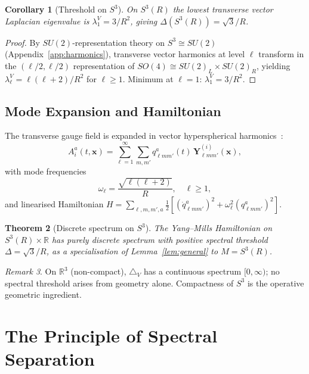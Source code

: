 \documentclass[
  aps,
  prd,
  reprint,
  superscriptaddress,
  nofootinbib,
  longbibliography,
  amsmath,
  amssymb
]{revtex4-2}
\theoremstyle{plain}
\newtheorem{theorem}{Theorem}[section]
\newtheorem{corollary}[theorem]{Corollary}
\theoremstyle{definition}
\theoremstyle{remark}
\newtheorem{remark}[theorem]{Remark}
\newcommand{\half}{\tfrac{1}{2}}
\begin{document}
\begin{corollary}[Threshold on $S^3$]
  \label{cor:s3}
  On $S^3(R)$ the lowest transverse vector Laplacian eigenvalue is
  $\lambda_1^V = 3/R^2$, giving $\Delta(S^3(R))=\sqrt3/R$.
\end{corollary}

\begin{proof}
  By $SU(2)$-representation theory on $S^3\cong SU(2)$
  (Appendix~\ref{app:harmonics}), transverse vector harmonics at level
  $\ell$ transform in the $(\ell/2,\ell/2)$ representation of
  $SO(4)\cong SU(2)_L\times SU(2)_R$, yielding
  $\lambda_\ell^V = \ell(\ell+2)/R^2$ for $\ell\geq1$.
  Minimum at $\ell=1$: $\lambda_1^V=3/R^2$.
\end{proof}

\subsection{Mode Expansion and Hamiltonian}

The transverse gauge field is expanded in vector hyperspherical
harmonics~\cite{Camporesi1994}:
\begin{equation}
  A_i^a(t,\mathbf{x}) = \sum_{\ell=1}^\infty\sum_{m,m'}
    q_{\ell mm'}^a(t)\,\mathbf{Y}_{\ell mm'}^{(i)}(\mathbf{x}),
  \label{eq:modeexp}
\end{equation}
with mode frequencies
\begin{equation}
  \boxed{\omega_\ell = \frac{\sqrt{\ell(\ell+2)}}{R},\quad\ell\geq1,}
  \label{eq:freq}
\end{equation}
and linearised Hamiltonian
$H=\sum_{\ell,m,m',a}\half[(\dot q_{\ell mm'}^a)^2
+\omega_\ell^2(q_{\ell mm'}^a)^2]$.

\begin{theorem}[Discrete spectrum on $S^3$]
  \label{thm:discrete}
  The Yang--Mills Hamiltonian on $S^3(R)\times\mathbb{R}$ has purely
  discrete spectrum with positive spectral threshold $\Delta=\sqrt3/R$,
  as a specialisation of Lemma~\ref{lem:general} to $M=S^3(R)$.
\end{theorem}

\begin{remark}
  On $\mathbb{R}^3$ (non-compact), $\triangle_V$ has a continuous
  spectrum $[0,\infty)$; no spectral threshold arises from geometry
  alone. Compactness of $S^3$ is the operative geometric ingredient.
\end{remark}

\section{The Principle of Spectral Separation}
\label{sec:separation}
\end{document}
